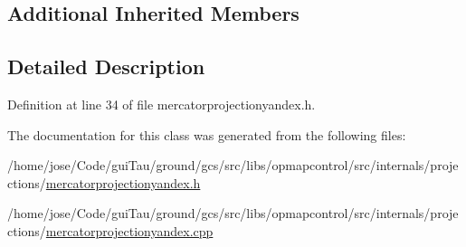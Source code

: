 \subsection*{Additional Inherited Members}


\subsection{Detailed Description}


Definition at line 34 of file mercatorprojectionyandex.\-h.



The documentation for this class was generated from the following files\-:\begin{DoxyCompactItemize}
\item 
/home/jose/\-Code/gui\-Tau/ground/gcs/src/libs/opmapcontrol/src/internals/projections/\hyperlink{mercatorprojectionyandex_8h}{mercatorprojectionyandex.\-h}\item 
/home/jose/\-Code/gui\-Tau/ground/gcs/src/libs/opmapcontrol/src/internals/projections/\hyperlink{mercatorprojectionyandex_8cpp}{mercatorprojectionyandex.\-cpp}\end{DoxyCompactItemize}

